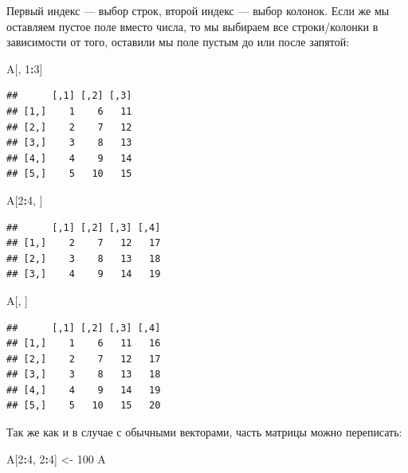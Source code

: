 \documentclass[]{book}
\newenvironment{Shaded}{\begin{snugshade}}{\end{snugshade}}
\newcommand{\DecValTok}[1]{\textcolor[rgb]{0.00,0.00,0.81}{#1}}
\newcommand{\StringTok}[1]{\textcolor[rgb]{0.31,0.60,0.02}{#1}}
\newcommand{\OperatorTok}[1]{\textcolor[rgb]{0.81,0.36,0.00}{\textbf{#1}}}
\newcommand{\NormalTok}[1]{#1}
\begin{document}
Первый индекс --- выбор строк, второй индекс --- выбор колонок. Если же
мы оставляем пустое поле вместо числа, то мы выбираем все строки/колонки
в зависимости от того, оставили мы поле пустым до или после запятой:

\begin{Shaded}
\begin{Highlighting}[]
\NormalTok{A[, }\DecValTok{1}\OperatorTok{:}\DecValTok{3}\NormalTok{]}
\end{Highlighting}
\end{Shaded}

\begin{verbatim}
##      [,1] [,2] [,3]
## [1,]    1    6   11
## [2,]    2    7   12
## [3,]    3    8   13
## [4,]    4    9   14
## [5,]    5   10   15
\end{verbatim}

\begin{Shaded}
\begin{Highlighting}[]
\NormalTok{A[}\DecValTok{2}\OperatorTok{:}\DecValTok{4}\NormalTok{, ]}
\end{Highlighting}
\end{Shaded}

\begin{verbatim}
##      [,1] [,2] [,3] [,4]
## [1,]    2    7   12   17
## [2,]    3    8   13   18
## [3,]    4    9   14   19
\end{verbatim}

\begin{Shaded}
\begin{Highlighting}[]
\NormalTok{A[, ]}
\end{Highlighting}
\end{Shaded}

\begin{verbatim}
##      [,1] [,2] [,3] [,4]
## [1,]    1    6   11   16
## [2,]    2    7   12   17
## [3,]    3    8   13   18
## [4,]    4    9   14   19
## [5,]    5   10   15   20
\end{verbatim}

Так же как и в случае с обычными векторами, часть матрицы можно
переписать:

\begin{Shaded}
\begin{Highlighting}[]
\NormalTok{A[}\DecValTok{2}\OperatorTok{:}\DecValTok{4}\NormalTok{, }\DecValTok{2}\OperatorTok{:}\DecValTok{4}\NormalTok{] <-}\StringTok{ }\DecValTok{100}
\NormalTok{A}
\end{Highlighting}
\end{Shaded}
\end{document}
